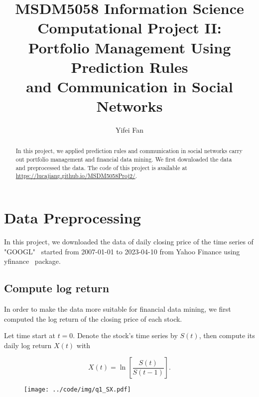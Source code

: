 \documentclass[runningheads]{llncs}
\begin{document}
\title{MSDM5058 Information Science\\
    Computational Project II:\\
    Portfolio Management Using Prediction Rules\\
    and Communication in Social Networks}
\author{Yifei Fan}
\maketitle

\begin{abstract}
    In this project, we applied prediction rules and communication in social networks carry out portfolio management and financial data mining.
    We first downloaded the data and preprocessed the data.
    The code of this project is available at \url{https://lucajiang.github.io/MSDM5058Proj2/}.
\end{abstract}


\section{Data Preprocessing}\label{sec:1}

In this project, we downloaded the data of
daily closing price of the time series of "GOOGL"~\cite{goolge}
started from 2007-01-01 to 2023-04-10 from Yahoo Finance
using yfinance~\cite{yfinance} package.
\subsection{Compute log return}
In order to make the data more suitable for financial data mining,
we first computed the log return of the closing price of each stock.

Let time start at $t = 0$. Denote the stock's time series by $S(t)$, then compute its daily log return $X(t)$ with

\begin{equation}
    X(t)=\ln \left[\frac{S(t)}{S(t-1)}\right].
\end{equation}

\begin{figure}[!htbp]
    \begin{center}
        \texttt{[image: ../code/img/q1\_SX.pdf]}
    \end{center}
    \caption{}
    \label{fig:q1sx}
\end{figure}
\end{document}
